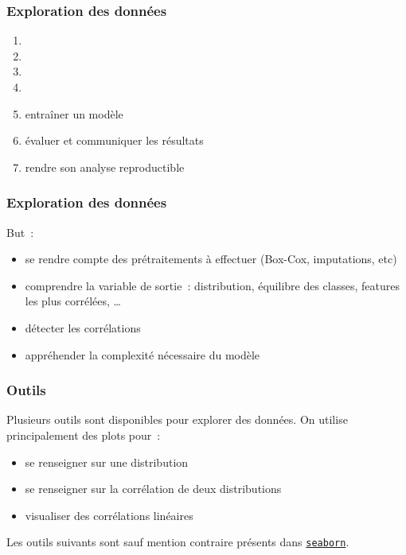 \documentclass{formation}
\begin{document}
\begin{frame}
  \frametitle{Exploration des données}

  \begin{enumerate}
  \item {}
  \item {}
  \item {}
  \item {}
  \item entraîner un modèle
  \item évaluer et communiquer les résultats
  \item rendre son analyse reproductible
  \end{enumerate}
\end{frame}

\begin{frame}
  \frametitle{Exploration des données}

  But :

  \begin{itemize}[<+->]
  \item se rendre compte des prétraitements à effectuer (Box-Cox,
    imputations, etc)
  \item comprendre la variable de sortie : distribution, équilibre des
    classes, features les plus corrélées, …
  \item détecter les corrélations
  \item appréhender la complexité nécessaire du modèle
  \end{itemize}

\end{frame}

\begin{frame}
  \frametitle{Outils}
  Plusieurs outils sont disponibles pour explorer des données. On
  utilise principalement des plots pour :

  \begin{itemize}
  \item se renseigner sur une distribution
  \item se renseigner sur la corrélation de deux distributions
  \item visualiser des corrélations linéaires
  \end{itemize}

  Les outils suivants sont sauf mention contraire présents dans
  \href{https://seaborn.pydata.org/}{\texttt{seaborn}}.
\end{frame}
\end{document}
